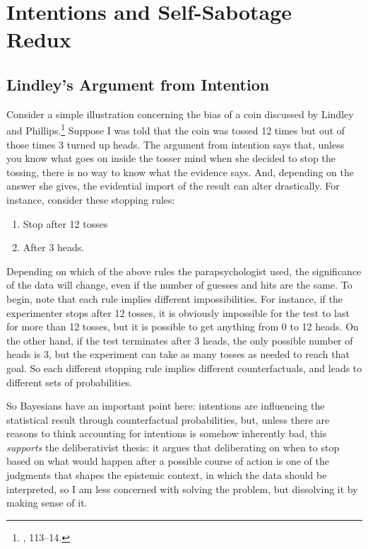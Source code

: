 \hypertarget{intentions-and-self-sabotage-redux}{%
\section{Intentions and Self-Sabotage
Redux}\label{sec:intentions-and-self-sabotage-redux}}
\subsection{Lindley's Argument from Intention}
Consider a simple illustration concerning the bias of a coin discussed
by Lindley and Phillips.\footnote{\cite{lindleybern}, 113--14.} Suppose I was told
that the coin was tossed 12 times but out of those times 3 turned up
heads. The argument from intention says that, unless you know what goes
on inside the tosser mind when she decided to stop the tossing, there is
no way to know what the evidence says. And, depending on the answer she
gives, the evidential import of the result can alter drastically. For
instance, consider these stopping rules:

\begin{enumerate}
\def\labelenumi{\arabic{enumi}.}
\tightlist
\item
  Stop after 12 tosses
\item
  After 3 heads.
\end{enumerate}

Depending on which of the above rules the
parapsychologist used, the significance of the data will change, even if
the number of guesses and hits are the same. To begin, note that each
rule implies different impossibilities. For instance, if the
experimenter stops after 12 tosses, it is obviously impossible for the
test to last for more than 12 tosses, but it is possible to get anything from 0 to 12 heads. On the other hand, if
the test terminates after 3 heads, the only possible number of heads is
3, but the experiment can take as many tosses as needed to reach that
goal. So each different stopping rule implies different counterfactuals,
and leads to different sets of probabilities.

So Bayesians have an important point here: intentions are influencing
the statistical result through counterfactual probabilities, but, unless
there are reasons to think accounting for intentions is somehow
inherently bad, this \emph{supports} the deliberativist thesis: it argues that deliberating on when to stop based on what would happen after a possible course of action is one of the judgments that shapes the epistemic context, in which the data should be interpreted, so I am less concerned with solving the problem, but dissolving it by making sense of it. 

